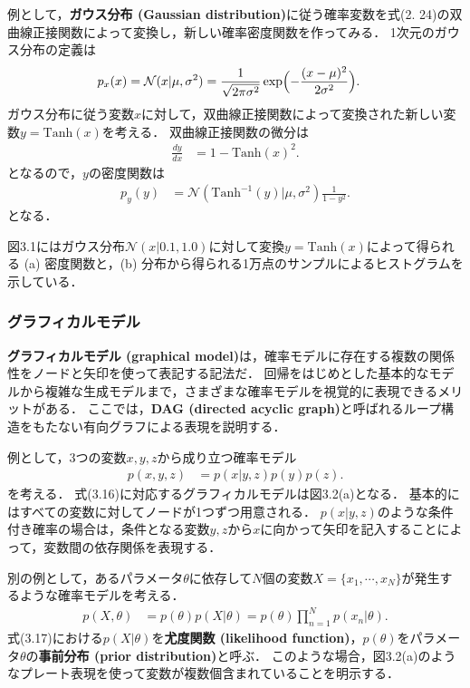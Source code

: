 \documentclass[11pt,a4paper]{jsarticle}
\numberwithin{equation}{section}
\begin{document}
例として，\textbf{ガウス分布 (Gaussian distribution)}に従う確率変数を式(2. 24)の双曲線正接関数によって変換し，新しい確率密度関数を作ってみる．
1次元のガウス分布の定義は
\begin{align}
p_x (x)
& =
\mathcal{N} (x | \mu, \sigma^2)
= \frac{1}{\sqrt{2 \pi \sigma^2}} \exp \Bigl( -\frac{(x - \mu)^2}{2 \sigma^2} \Bigr).
\end{align}
ガウス分布に従う変数$x$に対して，双曲線正接関数によって変換された新しい変数$y = \mathrm{Tanh} (x)$を考える．
双曲線正接関数の微分は
\begin{align}
\frac{dy}{dx}
& =
1 - \mathrm{Tanh} (x)^2.
\end{align}
となるので，$y$の密度関数は
\begin{align}
p_y (y)
& =
\mathcal{N} (\mathrm{Tanh}^{-1} (y) | \mu, \sigma^2) \frac{1}{1 - y^2}.
\end{align}
となる．

図3.1にはガウス分布$\mathcal{N} (x | 0.1, 1.0)$に対して変換$y = \mathrm{Tanh} (x)$によって得られる
(a) 密度関数と，(b) 分布から得られる1万点のサンプルによるヒストグラムを示している．

\subsubsection{グラフィカルモデル}
\textbf{グラフィカルモデル (graphical model)}は，確率モデルに存在する複数の関係性をノードと矢印を使って表記する記法だ．
回帰をはじめとした基本的なモデルから複雑な生成モデルまで，さまざまな確率モデルを視覚的に表現できるメリットがある．
ここでは，\textbf{DAG (directed acyclic graph)}と呼ばれるループ構造をもたない有向グラフによる表現を説明する．

例として，3つの変数$x, y, z$から成り立つ確率モデル
\begin{align}
p(x, y, z)
& =
p(x | y, z) p(y) p(z).
\end{align}
を考える．
式(3.16)に対応するグラフィカルモデルは図3.2(a)となる．
基本的にはすべての変数に対してノードが1つずつ用意される．
$p(x | y, z)$のような条件付き確率の場合は，条件となる変数$y, z$から$x$に向かって矢印を記入することによって，変数間の依存関係を表現する．

別の例として，あるパラメータ$\theta$に依存して$N$個の変数$X = \{ x_1, \cdots, x_N \}$が発生するような確率モデルを考える．
\begin{align}
p(X, \theta)
& =
p(\theta) p(X | \theta)
= p(\theta) \prod_{n=1}^N p(x_n | \theta).
\end{align}
式(3.17)における$p(X | \theta)$を\textbf{尤度関数 (likelihood function)}，$p(\theta)$をパラメータ$\theta$の\textbf{事前分布 (prior distribution)}と呼ぶ．
このような場合，図3.2(a)のようなプレート表現を使って変数が複数個含まれていることを明示する．
\end{document}
